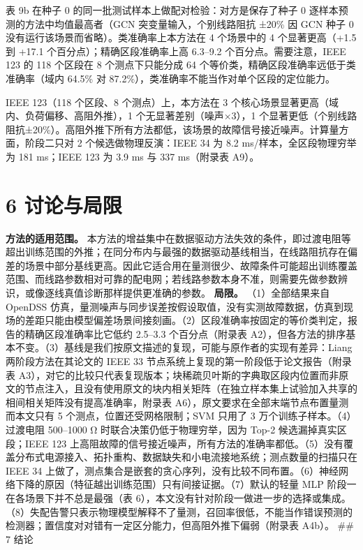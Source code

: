 \documentclass[
  11pt,
]{ctexart}
\begin{document}
表 9b 在种子 0 的同一批测试样本上做配对检验：对方是保存了种子 0
逐样本预测的方法中均值最高者（GCN 突变量输入，个别线路阻抗 ±20\% 因 GCN
种子 0 没有运行该场景而省略）。类准确率上本方法在 4 个场景中的 4
个显著更高（+1.5 到 +17.1 个百分点）；精确区段准确率上高 6.3--9.2
个百分点。需要注意，IEEE 123 的 118 个区段在 8 个测点下只能分成 64
个等价类，精确区段准确率远低于类准确率（域内 64.5\% 对
87.2\%），类准确率不能当作对单个区段的定位能力。

IEEE 123（118 个区段、8 个测点）上，本方法在 3
个核心场景显著更高（域内、负荷偏移、高阻外推），1
个无显著差别（噪声×3），1
个显著更低（个别线路阻抗±20\%）。高阻外推下所有方法都低，该场景的故障信号接近噪声。计算量方面，阶段二只对
2 个候选做物理反演：IEEE 34 为 8.2 ms/样本，全区段物理穷举为 181
ms；IEEE 123 为 3.9 ms 与 337 ms（附录表 A9）。

\hypertarget{ux8ba8ux8bbaux4e0eux5c40ux9650}{%
\section{6 讨论与局限}\label{ux8ba8ux8bbaux4e0eux5c40ux9650}}

\textbf{方法的适用范围。}
本方法的增益集中在数据驱动方法失效的条件，即过渡电阻等超出训练范围的外推；在同分布内与最强的数据驱动基线相当，在线路阻抗存在偏差的场景中部分基线更高。因此它适合用在量测很少、故障条件可能超出训练覆盖范围、而线路参数相对可靠的配电网；若线路参数本身不准，则需要先做参数辨识，或像逐线真值诊断那样提供更准确的参数。
\textbf{局限。} （1）全部结果来自 OpenDSS
仿真，量测噪声与同步误差按假设取值，没有实测故障数据，仿真到现场的差距只能由模型偏差场景间接刻画。（2）区段准确率按固定的等价类判定，报告的精确区段准确率比它低约
2.5--3.3 个百分点（附录表
A2），但各方法的排序基本不变。（3）基线是我们按原文描述的复现，可能与原作者的实现有差异：Liang
两阶段方法在其论文的 IEEE 33
节点系统上复现的第一阶段低于论文报告（附录表
A3），对它的比较只代表复现版本；块稀疏贝叶斯的字典取区段内位置而非原文的节点注入，且没有使用原文的块内相关矩阵（在独立样本集上试验加入共享的相间相关矩阵没有提高准确率，附录表
A6），原文要求在全部末端节点布置量测而本文只有 5
个测点，位置还受网格限制；SVM 只用了 3 万个训练子样本。（4）过渡电阻
500--1000 Ω 时联合决策仍低于物理穷举，因为 Top-2 候选漏掉真实区段；IEEE
123
上高阻故障的信号接近噪声，所有方法的准确率都低。（5）没有覆盖分布式电源接入、拓扑重构、数据缺失和小电流接地系统；测点数量的扫描只在
IEEE 34
上做了，测点集合是嵌套的贪心序列，没有比较不同布置。（6）神经网络下降的原因（特征越出训练范围）只有间接证据。（7）默认的轻量
MLP 阶段一在各场景下并不总是最强（表
6），本文没有针对阶段一做进一步的选择或集成。（8）失配告警只表示物理模型解释不了量测，召回率很低，不能当作错误预测的检测器；置信度对对错有一定区分能力，但高阻外推下偏弱（附录表
A4b）。 \#\# 7 结论
\end{document}
